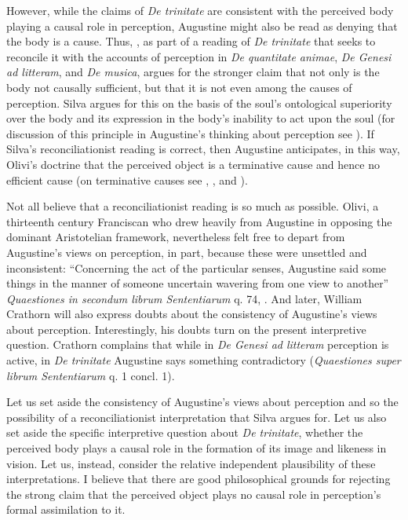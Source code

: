 \documentclass[12pt]{article}
\begin{document}
However, while the claims of \emph{De trinitate} are consistent with the perceived body playing a causal role in perception, Augustine might also be read as denying that the body is a cause. Thus, \citealt{Silva:2014bh}, as part of a reading of \emph{De trinitate} that seeks to reconcile it with the accounts of perception in \emph{De quantitate animae}, \emph{De Genesi ad litteram}, and \emph{De musica}, argues for the stronger claim that not only is the body not causally sufficient, but that it is not even among the causes of perception. Silva argues for this on the basis of the soul's ontological superiority over the body and its expression in the body's inability to act upon the soul (for discussion of this principle in Augustine's thinking about perception see \citealt{Brittain:2002hl}). If Silva's \citeyearpar{Silva:2014bh} reconciliationist reading is correct, then Augustine anticipates, in this way, Olivi's doctrine that the perceived object is a terminative cause and hence no efficient cause (on terminative causes see \citealt[192--195]{Kent:1984zm}, \citealt[chapter 5.2]{Pasnau:1997aa}, and \citealt[chapter 6]{Toivanen:2013ul}).

Not all believe that a reconciliationist reading is so much as possible. Olivi, a thirteenth century Franciscan who drew heavily from Augustine in opposing the dominant Aristotelian framework, nevertheless felt free to depart from Augustine's views on perception, in part, because these were unsettled and inconsistent: ``Concerning the act of the particular senses, Augustine said some things in the manner of someone uncertain wavering from one view to another'' \emph{Quaestiones in secondum librum Sententiarum} q. 74, \citealt[131]{Pasnau:1997aa}. And later, William Crathorn will also express doubts about the consistency of Augustine's views about perception. Interestingly, his doubts turn on the present interpretive question. Crathorn complains that while in \emph{De Genesi ad litteram} perception is active, in \emph{De trinitate} Augustine says something contradictory (\emph{Quaestiones super librum Sententiarum} q. 1 concl. 1).

Let us set aside the consistency of Augustine's views about perception and so the possibility of a reconciliationist interpretation that Silva argues for. Let us also set aside the specific interpretive question about \emph{De trinitate}, whether the perceived body plays a causal role in the formation of its image and likeness in vision. Let us, instead, consider the relative independent plausibility of these interpretations.  I believe that there are good philosophical grounds for rejecting the strong claim that the perceived object plays no causal role in perception's formal assimilation to it.
\end{document}
